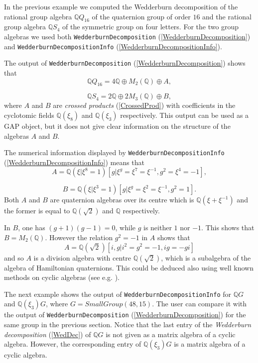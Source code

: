 \documentclass[a4paper,11pt]{report}
\begin{document}
{{\begin{Verbatim}[commandchars=!@|,fontsize=\small,frame=single,label=Example]
\end{Verbatim}
 In the previous example we computed the Wedderburn decomposition of the
rational group algebra ${\ensuremath{\mathbb Q}} Q_{16}$ of the quaternion group of order $16$ and the rational group algebra ${\ensuremath{\mathbb Q}} S_{4}$ of the symmetric group on four letters. For the two group algebras we used
both \texttt{WedderburnDecomposition} (\ref{WedderburnDecomposition}) and \texttt{WedderburnDecompositionInfo} (\ref{WedderburnDecompositionInfo}). 

 The output of \texttt{WedderburnDecomposition} (\ref{WedderburnDecomposition}) shows that 
\[ {\ensuremath{\mathbb Q}} Q_{16} = 4 {\ensuremath{\mathbb Q}} \oplus M_2(
{\ensuremath{\mathbb Q}} ) \oplus A, \]
 
\[ {\ensuremath{\mathbb Q}} S_{4} = 2 {\ensuremath{\mathbb Q}} \oplus 2 M_3(
{\ensuremath{\mathbb Q}} ) \oplus B, \]
 where $A$ and $B$ are \emph{crossed products} (\ref{CrossedProd}) with coefficients in the cyclotomic fields ${\ensuremath{\mathbb Q}} (\xi_8)$ and ${\ensuremath{\mathbb Q}} (\xi_3)$ respectively. This output can be used as a \textsf{GAP} object, but it does not give clear information on the structure of the
algebras $A$ and $B$. 

 The numerical information displayed by \texttt{WedderburnDecompositionInfo} (\ref{WedderburnDecompositionInfo}) means that 
\[ A = {\ensuremath{\mathbb Q}} (\xi|\xi^8=1)[g | \xi^g = \xi^7 = \xi^{-1}, g^2 =
\xi^4 = -1], \]
 
\[ B = {\ensuremath{\mathbb Q}} (\xi|\xi^3=1)[g | \xi^g = \xi^2 = \xi^{-1}, g^2 =
1]. \]
 Both $A$ and $B$ are quaternion algebras over its centre which is ${\ensuremath{\mathbb Q}} (\xi+\xi^{-1})$ and the former is equal to ${\ensuremath{\mathbb Q}} (\sqrt{2})$ and ${\ensuremath{\mathbb Q}}$ respectively. 

 In $B$, one has $(g+1)(g-1)=0$, while $g$ is neither $1$ nor $-1$. This shows that $B=M_2( {\ensuremath{\mathbb Q}} )$. However the relation $g^2=-1$ in $A$ shows that 
\[ A={\ensuremath{\mathbb Q}} (\sqrt{2})[i,g|i^2=g^2=-1,ig=-gi] \]
 and so $A$ is a division algebra with centre ${\ensuremath{\mathbb Q}} (\sqrt{2})$, which is a subalgebra of the algebra of Hamiltonian quaternions. This could
be deduced also using well known methods on cyclic algebras (see e.g. \cite{R}). 

 The next example shows the output of \texttt{WedderburnDecompositionInfo} for ${\ensuremath{\mathbb Q}} G$ and ${\ensuremath{\mathbb Q}} (\xi_3) G$, where $G=SmallGroup(48,15)$. The user can compare it with the output of \texttt{WedderburnDecomposition} (\ref{WedderburnDecomposition}) for the same group in the previous section. Notice that the last entry of the \emph{Wedderburn decomposition} (\ref{WedDec}) of ${\ensuremath{\mathbb Q}} G$ is not given as a matrix algebra of a cyclic algebra. However, the
corresponding entry of ${\ensuremath{\mathbb Q}} (\xi_3) G$ is a matrix algebra of a cyclic algebra. 
\begin{Verbatim}[commandchars=!@|,fontsize=\small,frame=single,label=Example]
  

\end{Verbatim}}}
\end{document}
